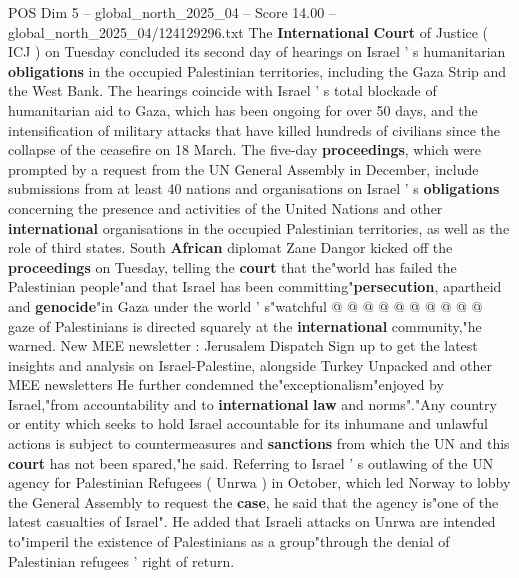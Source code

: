 \begin{textsample}{POS Dim 5 – global\_north\_2025\_04 – Score 14.00 – global\_north\_2025\_04/124129296.txt}  \label{ex:f5_pos_100}
The \textbf{International} \textbf{Court} of Justice ( ICJ ) on Tuesday concluded its second day of hearings on Israel ' s humanitarian \textbf{obligations} in the occupied Palestinian territories, including the Gaza Strip and the West Bank.
The hearings coincide with Israel ' s total blockade of humanitarian aid to Gaza, which has been ongoing for over 50 days, and the intensification of military attacks that have killed hundreds of civilians since the collapse of the ceasefire on 18 March.
The five-day \textbf{proceedings}, which were prompted by a request from the UN General Assembly in December, include submissions from at least 40 nations and organisations on Israel ' s \textbf{obligations} concerning the presence and activities of the United Nations and other \textbf{international} organisations in the occupied Palestinian territories, as well as the role of third states.
South \textbf{African} diplomat Zane Dangor kicked off the \textbf{proceedings} on Tuesday, telling the \textbf{court} that the"world has failed the Palestinian people"and that Israel has been committing"\textbf{persecution}, apartheid and \textbf{genocide}"in Gaza under the world ' s"watchful @ @ @ @ @ @ @ @ @ @ gaze of Palestinians is directed squarely at the \textbf{international} community,"he warned.
New MEE newsletter : Jerusalem Dispatch Sign up to get the latest insights and analysis on Israel-Palestine, alongside Turkey Unpacked and other MEE newsletters He further condemned the"exceptionalism"enjoyed by Israel,"from accountability and to \textbf{international} \textbf{law} and norms"."Any country or entity which seeks to hold Israel accountable for its inhumane and unlawful actions is subject to countermeasures and \textbf{sanctions} from which the UN and this \textbf{court} has not been spared,"he said.
Referring to Israel ' s outlawing of the UN agency for Palestinian Refugees ( Unrwa ) in October, which led Norway to lobby the General Assembly to request the \textbf{case}, he said that the agency is"one of the latest casualties of Israel".
He added that Israeli attacks on Unrwa are intended to"imperil the existence of Palestinians as a group"through the denial of Palestinian refugees ' right of return.

\end{textsample}
